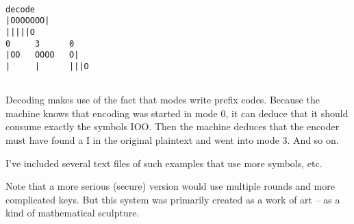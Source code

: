 \documentclass{article}
\begin{document}
\begin{huge}
{{\begin{verbatim}

decode
|OOOOOOO|
|||||O
0     3      0      
|OO   OOOO   O|     
|     |      |||O  
   

\end{verbatim}

Decoding makes use of the fact that modes write prefix codes. Because the machine knows that encoding was started in mode 0, it can deduce that it should consume exactly the symbols IOO. Then the machine deduces that the encoder must have found a I in the original plaintext and went into mode 3. And so on. 

I've included several text files of such examples that use more symbols, etc. 

Note that a more serious (secure) version would use multiple rounds and more complicated keys. But this system was primarily created as a work of art -- as a kind of mathematical sculpture. 


}}
\end{huge}
\end{document}
